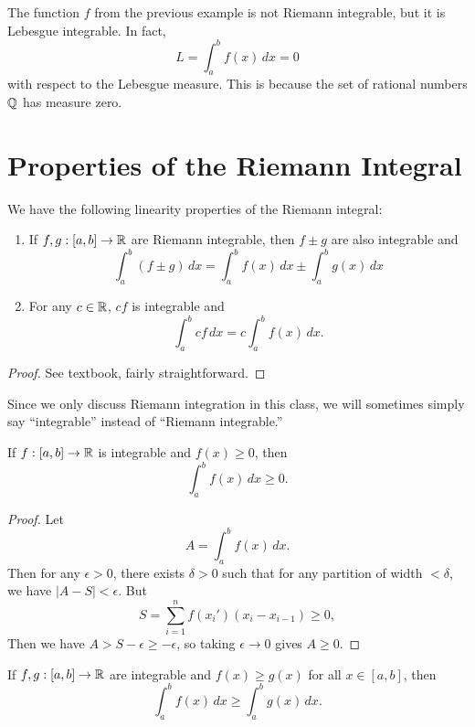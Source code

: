 \begin{remark}
  The function $f$ from the previous example is not
  Riemann integrable, but it is Lebesgue integrable.
  In fact,
  \[
    L = \int_a^b f(x)\, dx = 0
  \]
  with respect to the Lebesgue measure. This
  is because the set of rational numbers
  $\mathbb{Q}$ has measure zero.
\end{remark}

\section{Properties of the Riemann Integral}
\begin{prop}
We have the following linearity properties of the Riemann integral:
\begin{enumerate}
  \item If $f, g : [a, b] \to \mathbb{R}$ are Riemann integrable, then
  $f \pm g$ are also integrable and
  \[
    \int_a^b (f \pm g) \, dx = \int_a^b f(x)\, dx \pm \int_a^b g(x)\, dx
  \]
  \item For any $c \in \mathbb{R}$, $cf$ is integrable
    and
    \[
      \int_a^b cf \, dx = c \int_a^b f(x)\, dx.
    \]
\end{enumerate}
\end{prop}

\begin{proof}
  See textbook, fairly straightforward.
\end{proof}

\begin{remark}
  Since we only discuss Riemann integration in this
  class, we will sometimes simply say ``integrable''
  instead of ``Riemann integrable.''
\end{remark}

\begin{prop}
  If $f : [a, b] \to \mathbb{R}$ is integrable and $f(x) \ge 0$,
  then
  \[
    \int_a^b f(x)\, dx \ge 0.
  \]
\end{prop}

\begin{proof}
  Let
  \[A = \int_a^b f(x)\, dx.\]
  Then for any $\epsilon > 0$, there exists $\delta > 0$
  such that for any partition of width $< \delta$,
  we have $|A - S| < \epsilon$. But
  \[
    S = \sum_{i = 1}^n f(x_i') (x_i - x_{i - 1}) \ge 0,
  \]
  Then we have $A > S - \epsilon \ge -\epsilon$, so
  taking $\epsilon \to 0$ gives $A \ge 0$.
\end{proof}

\begin{corollary}
  If $f, g : [a, b] \to \mathbb{R}$ are integrable and
  $f(x) \ge g(x)$ for all $x \in [a, b]$, then
  \[
    \int_a^b f(x)\, dx \ge \int_a^b g(x)\, dx.
  \]
\end{corollary}

